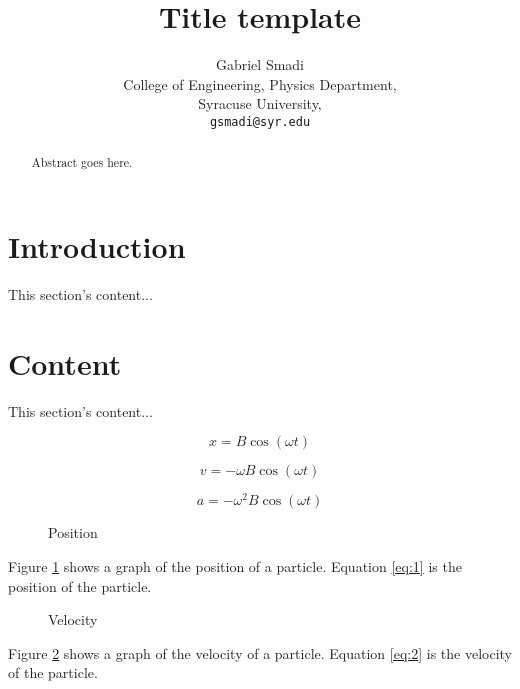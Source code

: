 \documentclass{article}
\begin{document}
\title{Title template}

\author{Gabriel Smadi\\
  College of Engineering,
  Physics Department, \\
  Syracuse University,\\
  \texttt{gsmadi@syr.edu}}
\maketitle

\begin{abstract}
Abstract goes here.
\end{abstract}

\section{Introduction}
This section's content...

\section{Content}
This section's content...

\begin{equation} \label{eq:1}
x=B\cos(\omega t)
\end{equation}

\begin{equation} \label{eq:2}
v=-\omega B\cos(\omega t)
\end{equation}

\begin{equation} \label{eq:3}
a=-\omega^2 B\cos(\omega t)
\end{equation}

\begin{figure}
  \begin{center}
    
  \end{center}
  \caption{Position}
  \label{fig:position}
\end{figure}

Figure \ref{fig:position} shows a graph of the position of a particle. Equation \ref{eq:1} is the position of the particle.

\begin{figure}
  \begin{center}
    
  \end{center}
  \caption{Velocity}
  \label{fig:velocity}
\end{figure}

Figure \ref{fig:velocity} shows a graph of the velocity of a particle. Equation \ref{eq:2} is the velocity of the particle.
\end{document}
